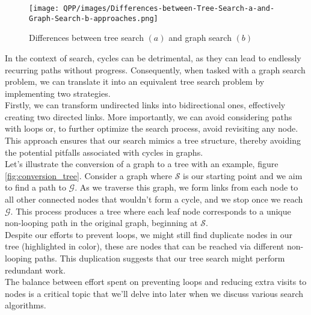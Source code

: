\documentclass[a4paper,UKenglish,cleveref, autoref, thm-restate]{qlinhta}
\begin{document}
\begin{figure}[H]
    \centering
    \texttt{[image: QPP/images/Differences-between-Tree-Search-a-and-Graph-Search-b-approaches.png]}
    \caption{Differences between tree search $(a)$ and graph search $(b)$}
    \label{fig:tree_graph_search}
\end{figure}

In the context of search, cycles can be detrimental, as they can lead to endlessly recurring paths without progress. Consequently, when tasked with a graph search problem, we can translate it into an equivalent tree search problem by implementing two strategies.\\

Firstly, we can transform undirected links into bidirectional ones, effectively creating two directed links. More importantly, we can avoid considering paths with loops or, to further optimize the search process, avoid revisiting any node. This approach ensures that our search mimics a tree structure, thereby avoiding the potential pitfalls associated with cycles in graphs.\\

Let's illustrate the conversion of a graph to a tree with an example, figure \ref{fig:conversion_tree}. Consider a graph where $\mathcal{S}$ is our starting point and we aim to find a path to $\mathcal{G}$. As we traverse this graph, we form links from each node to all other connected nodes that wouldn't form a cycle, and we stop once we reach $\mathcal{G}$. This process produces a tree where each leaf node corresponds to a unique non-looping path in the original graph, beginning at $\mathcal{S}$.\\

Despite our efforts to prevent loops, we might still find duplicate nodes in our tree (highlighted in color), these are nodes that can be reached via different non-looping paths. This duplication suggests that our tree search might perform redundant work.\\

The balance between effort spent on preventing loops and reducing extra visits to nodes is a critical topic that we'll delve into later when we discuss various search algorithms.\\
\end{document}

